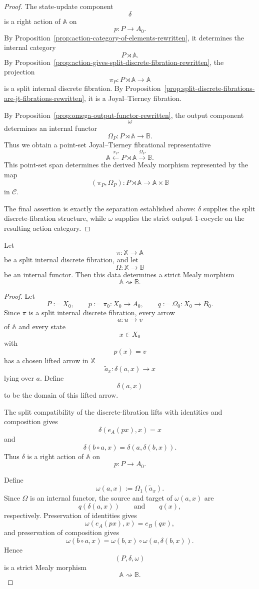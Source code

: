\begin{proof}
The state-update component
\[
\delta
\]
is a right action of \(\mathbb A\) on
\[
p:P\to A_0.
\]
By Proposition~\ref{prop:action-category-of-elements-rewritten}, it
determines the internal category
\[
P\rtimes\mathbb A.
\]
By Proposition~\ref{prop:action-gives-split-discrete-fibration-rewritten},
the projection
\[
\pi_P:P\rtimes\mathbb A\to\mathbb A
\]
is a split internal discrete fibration. By
Proposition~\ref{prop:split-discrete-fibrations-are-jt-fibrations-rewritten},
it is a Joyal--Tierney fibration.

By Proposition~\ref{prop:omega-output-functor-rewritten}, the output
component
\[
\omega
\]
determines an internal functor
\[
\Omega_P:P\rtimes\mathbb A\to\mathbb B.
\]
Thus we obtain a point-set Joyal--Tierney fibrational representative
\[
\mathbb A
\xleftarrow{\pi_P}
P\rtimes\mathbb A
\xrightarrow{\Omega_P}
\mathbb B.
\]
This point-set span determines the derived Mealy morphism represented by
the map
\[
(\pi_P,\Omega_P):
P\rtimes\mathbb A
\to
\mathbb A\times\mathbb B
\]
in \(\mathcal C\).

The final assertion is exactly the separation established above:
\(\delta\) supplies the split discrete-fibration structure, while
\(\omega\) supplies the strict output \(1\)-cocycle on the resulting
action category.
\end{proof}

\begin{proposition}
\label{prop:split-discrete-fibration-output-functor-gives-strict-mealy}
Let
\[
\pi:\mathbb X\to\mathbb A
\]
be a split internal discrete fibration, and let
\[
\Omega:\mathbb X\to\mathbb B
\]
be an internal functor. Then this data determines a strict Mealy morphism
\[
\mathbb A\rightsquigarrow\mathbb B.
\]
\end{proposition}

\begin{proof}
Let
\[
P:=X_0,
\qquad
p:=\pi_0:X_0\to A_0,
\qquad
q:=\Omega_0:X_0\to B_0.
\]
Since \(\pi\) is a split internal discrete fibration, every arrow
\[
a:u\to v
\]
of \(\mathbb A\) and every state
\[
x\in X_0
\]
with
\[
p(x)=v
\]
has a chosen lifted arrow in \(\mathbb X\)
\[
\widetilde a_x:\delta(a,x)\to x
\]
lying over \(a\). Define
\[
\delta(a,x)
\]
to be the domain of this lifted arrow.

The split compatibility of the discrete-fibration lifts with identities
and composition gives
\[
\delta(e_A(px),x)=x
\]
and
\[
\delta(b\circ a,x)
=
\delta(a,\delta(b,x)).
\]
Thus \(\delta\) is a right action of \(\mathbb A\) on
\[
p:P\to A_0.
\]

Define
\[
\omega(a,x):=\Omega_1(\widetilde a_x).
\]
Since \(\Omega\) is an internal functor, the source and target of
\(\omega(a,x)\) are
\[
q(\delta(a,x))
\qquad
\text{and}
\qquad
q(x),
\]
respectively. Preservation of identities gives
\[
\omega(e_A(px),x)=e_B(qx),
\]
and preservation of composition gives
\[
\omega(b\circ a,x)
=
\omega(b,x)\circ\omega(a,\delta(b,x)).
\]
Hence
\[
(P,\delta,\omega)
\]
is a strict Mealy morphism
\[
\mathbb A\rightsquigarrow\mathbb B.
\]
\end{proof}

